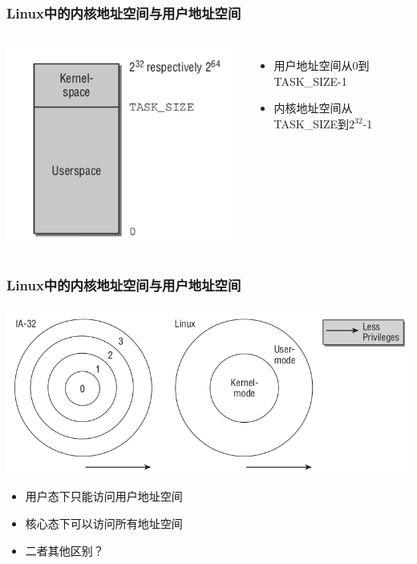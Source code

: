 \documentclass[xcolor=svgnames]{beamer}
\begin{document}
\begin{CJK*}{UTF8}{gbsn}
\begin{frame}[fragile]%
\frametitle{Linux中的内核地址空间与用户地址空间}
\begin{columns}%
\includegraphics[width=1.0\textwidth]{as.png}
\begin{itemize}
\item 用户地址空间从0到TASK\_SIZE-1
\item 内核地址空间从TASK\_SIZE到$2^{32}$-1
\end{itemize}
\end{columns}
\end{frame}

\begin{frame}[fragile]%
\frametitle{Linux中的内核地址空间与用户地址空间}
\includegraphics[width=1.0\textwidth]{ring.png}
\begin{itemize}
\item 用户态下只能访问用户地址空间
\item 核心态下可以访问所有地址空间
\item 二者其他区别？
\end{itemize}
\end{frame}


\end{CJK*}
\end{document}
